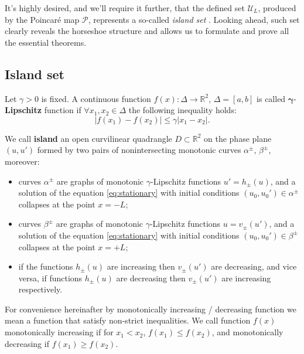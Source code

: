 It's highly desired, and we'll require it further, that the defined set $\mathscr{U}_L$, produced by the Poincar\'e map $\mathcal{P}$, represents a so-called {\it island set} \cite{AlfimovAvramenko}.
Looking ahead, such set clearly reveals the horseshoe structure and allows us to formulate and prove all the essential theorems. 

\subsection{Island set}

\begin{definition}
	Let $\gamma > 0$ is fixed.
	A continuous function $f(x): \Delta \to \mathbb{R}^2$, $\Delta = [a, b]$ is called $\bm{\gamma}$-{\bf Lipschitz} function if $\forall x_1, x_2 \in \Delta$ the following inequality holds:
	\begin{equation}
		|f(x_1) - f(x_2)| \le \gamma |x_1 - x_2|.
	\end{equation}
\end{definition}

\begin{definition}
	We call {\bf island} an open curvilinear quadrangle $D \subset \mathbb{R}^2$ on the phase plane $(u, u')$ formed by two pairs of nonintersecting monotonic curves $\alpha^{\pm}$, $\beta^{\pm}$, moreover:
	\begin{itemize}
		\item curves $\alpha^{\pm}$ are graphs of monotonic $\gamma$-Lipschitz functions $u' = h_{\pm}(u)$, and a solution of the equation \eqref{eq:stationary} with initial conditions $(u_0, u_0') \in \alpha^{\pm}$ collapses at the point $x = -L$;
		\item curves $\beta^{\pm}$ are graphs of monotonic $\gamma$-Lipschitz functions $u = v_{\pm}(u')$, and a solution of the equation \eqref{eq:stationary} with initial conditions $(u_0, u_0') \in \beta^{\pm}$ collapses at the point $x = +L$;
		\item if the functions $h_{\pm}(u)$ are increasing then $v_{\pm}(u')$ are decreasing, and vice versa, if functions $h_{\pm}(u)$ are decreasing then $v_{\pm}(u')$ are increasing respectively.
	\end{itemize}	
\end{definition}

\begin{remark}
	For convenience hereinafter by monotonically increasing / decreasing function we mean a function that satisfy non-strict inequalities.
	We call function $f(x)$ monotonically increasing if for $x_1 < x_2$, $f(x_1) \le f(x_2)$, and monotonically decreasing if $f(x_1) \ge f(x_2)$.
\end{remark}

